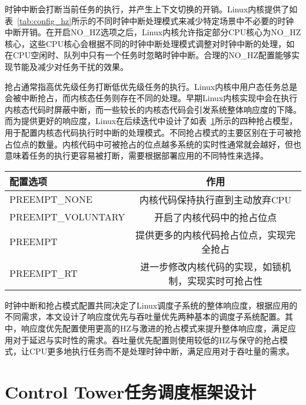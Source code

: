 时钟中断会打断当前任务的执行，并产生上下文切换的开销。Linux内核提供了如表~\ref{tab:config_hz}所示的不同时钟中断处理模式来减少特定场景中不必要的时钟中断开销。在开启NO\_HZ选项之后，Linux内核允许指定部分CPU核心为NO\_HZ核心，这些CPU核心会根据不同的时钟中断处理模式调整对时钟中断的处理，如在CPU空闲时、队列中只有一个任务时忽略时钟中断。合理的NO\_HZ配置能够实现节能及减少对任务干扰的效果。

抢占通常指高优先级任务打断低优先级任务的执行。Linux内核中用户态任务总是会被中断抢占，而内核态任务则存在不同的处理。早期Linux内核实现中会在执行内核态代码时屏蔽中断，而一些较长的内核态代码会引发系统整体响应度的下降。而为提供更好的响应度，Linux在后续迭代中设计了如表~\ref{tab:config_preempt}所示的四种抢占模型，用于配置内核态代码执行时中断的处理模式。不同抢占模式的主要区别在于可被抢占位点的数量。内核代码中可被抢占的位点越多系统的实时性通常就会越好，但也意味着任务的执行更容易被打断，需要根据部署应用的不同特性来选择。

\begin{table}
    \label{tab:config_preempt}
    \footnotesize%
    \setlength{\tabcolsep}{4pt}%
    \renewcommand{\arraystretch}{1.25}%
    \centering
    \begin{tabular}{lc}
        \hline
        配置选项 & 作用 \\
        \hline
        PREEMPT\_NONE  & 内核代码保持执行直到主动放弃CPU  \\
        PREEMPT\_VOLUNTARY  & 开启了内核代码中的抢占位点 \\
        PREEMPT  & 提供更多的内核代码抢占位点，实现完全抢占 \\
        PREEMPT\_RT & 进一步修改内核代码的实现，如锁机制，实现实时可抢占性 \\
        \hline
    \end{tabular}
\end{table}

时钟中断和抢占模式配置共同决定了Linux调度子系统的整体响应度，根据应用的不同需求，本文设计了响应度优先与吞吐量优先两种基本的调度子系统配置。其中，响应度优先配置使用更高的HZ与激进的抢占模式来提升整体响应度，满足应用对于延迟与实时性的需求。吞吐量优先配置则使用较低的HZ与保守的抢占模式，让CPU更多地执行任务而不是处理时钟中断，满足应用对于吞吐量的需求。

\section{Control Tower任务调度框架设计}


